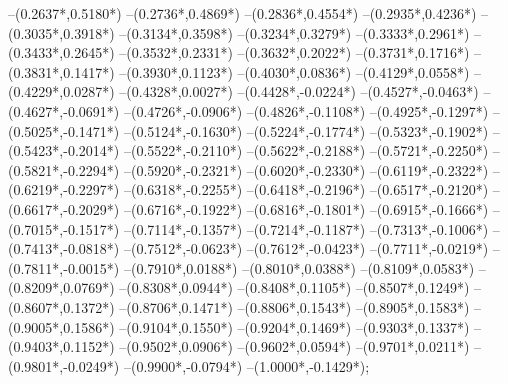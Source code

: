 {	--({0.2637*\xskala},{0.5180*\yskala})
	--({0.2736*\xskala},{0.4869*\yskala})
	--({0.2836*\xskala},{0.4554*\yskala})
	--({0.2935*\xskala},{0.4236*\yskala})
	--({0.3035*\xskala},{0.3918*\yskala})
	--({0.3134*\xskala},{0.3598*\yskala})
	--({0.3234*\xskala},{0.3279*\yskala})
	--({0.3333*\xskala},{0.2961*\yskala})
	--({0.3433*\xskala},{0.2645*\yskala})
	--({0.3532*\xskala},{0.2331*\yskala})
	--({0.3632*\xskala},{0.2022*\yskala})
	--({0.3731*\xskala},{0.1716*\yskala})
	--({0.3831*\xskala},{0.1417*\yskala})
	--({0.3930*\xskala},{0.1123*\yskala})
	--({0.4030*\xskala},{0.0836*\yskala})
	--({0.4129*\xskala},{0.0558*\yskala})
	--({0.4229*\xskala},{0.0287*\yskala})
	--({0.4328*\xskala},{0.0027*\yskala})
	--({0.4428*\xskala},{-0.0224*\yskala})
	--({0.4527*\xskala},{-0.0463*\yskala})
	--({0.4627*\xskala},{-0.0691*\yskala})
	--({0.4726*\xskala},{-0.0906*\yskala})
	--({0.4826*\xskala},{-0.1108*\yskala})
	--({0.4925*\xskala},{-0.1297*\yskala})
	--({0.5025*\xskala},{-0.1471*\yskala})
	--({0.5124*\xskala},{-0.1630*\yskala})
	--({0.5224*\xskala},{-0.1774*\yskala})
	--({0.5323*\xskala},{-0.1902*\yskala})
	--({0.5423*\xskala},{-0.2014*\yskala})
	--({0.5522*\xskala},{-0.2110*\yskala})
	--({0.5622*\xskala},{-0.2188*\yskala})
	--({0.5721*\xskala},{-0.2250*\yskala})
	--({0.5821*\xskala},{-0.2294*\yskala})
	--({0.5920*\xskala},{-0.2321*\yskala})
	--({0.6020*\xskala},{-0.2330*\yskala})
	--({0.6119*\xskala},{-0.2322*\yskala})
	--({0.6219*\xskala},{-0.2297*\yskala})
	--({0.6318*\xskala},{-0.2255*\yskala})
	--({0.6418*\xskala},{-0.2196*\yskala})
	--({0.6517*\xskala},{-0.2120*\yskala})
	--({0.6617*\xskala},{-0.2029*\yskala})
	--({0.6716*\xskala},{-0.1922*\yskala})
	--({0.6816*\xskala},{-0.1801*\yskala})
	--({0.6915*\xskala},{-0.1666*\yskala})
	--({0.7015*\xskala},{-0.1517*\yskala})
	--({0.7114*\xskala},{-0.1357*\yskala})
	--({0.7214*\xskala},{-0.1187*\yskala})
	--({0.7313*\xskala},{-0.1006*\yskala})
	--({0.7413*\xskala},{-0.0818*\yskala})
	--({0.7512*\xskala},{-0.0623*\yskala})
	--({0.7612*\xskala},{-0.0423*\yskala})
	--({0.7711*\xskala},{-0.0219*\yskala})
	--({0.7811*\xskala},{-0.0015*\yskala})
	--({0.7910*\xskala},{0.0188*\yskala})
	--({0.8010*\xskala},{0.0388*\yskala})
	--({0.8109*\xskala},{0.0583*\yskala})
	--({0.8209*\xskala},{0.0769*\yskala})
	--({0.8308*\xskala},{0.0944*\yskala})
	--({0.8408*\xskala},{0.1105*\yskala})
	--({0.8507*\xskala},{0.1249*\yskala})
	--({0.8607*\xskala},{0.1372*\yskala})
	--({0.8706*\xskala},{0.1471*\yskala})
	--({0.8806*\xskala},{0.1543*\yskala})
	--({0.8905*\xskala},{0.1583*\yskala})
	--({0.9005*\xskala},{0.1586*\yskala})
	--({0.9104*\xskala},{0.1550*\yskala})
	--({0.9204*\xskala},{0.1469*\yskala})
	--({0.9303*\xskala},{0.1337*\yskala})
	--({0.9403*\xskala},{0.1152*\yskala})
	--({0.9502*\xskala},{0.0906*\yskala})
	--({0.9602*\xskala},{0.0594*\yskala})
	--({0.9701*\xskala},{0.0211*\yskala})
	--({0.9801*\xskala},{-0.0249*\yskala})
	--({0.9900*\xskala},{-0.0794*\yskala})
	--({1.0000*\xskala},{-0.1429*\yskala});
}
